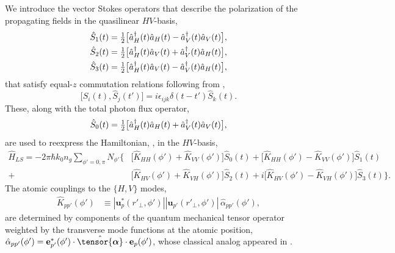 \documentclass[preprint, aps,pra,onecolumn]{revtex4-1} %
\newcommand{\poltens}{\hat{\tensor{\boldsymbol{\alpha}}}}
\newcommand{\polcomp}{\hat{K}} %
\begin{document}
We introduce the vector Stokes operators that describe the polarization of the propagating fields in the quasilinear $HV$-basis,
\begin{subequations}\label{Eq::StokesComponents}
	\begin{align} 
		\hat{S}_1(t) & = \mbox{$\frac{1}{2}$}\big[ \hat{a}^\dag_H(t) \hat{a}_H(t)-\hat{a}^\dag_V(t) \hat{a}_V(t) \big], \\
	 	\hat{S}_2(t) & = \mbox{$\frac{1}{2}$}\big[ \hat{a}^\dag_H(t) \hat{a}_V(t)+\hat{a}^\dag_V(t) \hat{a}_H(t) \big], \\ 
		\hat{S}_3(t) & = \mbox{$\frac{1}{2}$}\big[ \hat{a}^\dag_H(t) \hat{a}_V(t) -\hat{a}^\dag_V(t) \hat{a}_H(t) \big],
	\end{align}
\end{subequations}
that satisfy equal-$z$ commutation relations following from ,
	\begin{equation} \label{Eq::StokesCommutation}
		\big[\hat{S}_i(t), \hat{S}_j(t')\big] =i \epsilon_{ijk} \delta(t-t')  \hat{S}_k(t).
	\end{equation}
These, along with the total photon flux operator,
	\begin{equation}
		\hat{S}_0(t) = \mbox{$\frac{1}{2}$}\big[ \hat{a}^\dag_H(t) \hat{a}_H(t)+\hat{a}^\dag_V(t) \hat{a}_V(t) \big],
	\end{equation}
are used to reexpress the Hamiltonian, , in the $HV$-basis,
	\begin{align}  
		\hat{H}_{LS} 	= - 2 \pi \hbar k_0 n_g \sum_{\phi'=0,\pi}N_{\phi'} \Big\{ &\big[ \polcomp_{HH}(\phi')+\polcomp_{VV}(\phi') \big] \hat{S}_0(t) +  \big[\polcomp_{HH}(\phi')  - \polcomp_{VV}(\phi')  \big] \hat{S}_1(t)  \label{Eq::GenHamiltonian}  \\
+ &\big[\polcomp_{HV}(\phi') + \polcomp_{VH}(\phi')  \big] \hat{S}_2(t) + i  \big[ \polcomp_{HV}(\phi')-\polcomp_{VH}(\phi') \big]\hat{S}_3(t) \Big\}. \nonumber
	\end{align}
The atomic couplings to the $\{H,V\}$ modes,
	\begin{align} 
		\polcomp_{p p'}(\phi') & \equiv |\mathbf{u}^*_p(r'_\perp, \phi')||\mathbf{u}_{p'}(r'_\perp, \phi')| \, \hat{\alpha}_{p p'}(\phi') , 
	\end{align}
are determined by components of the quantum mechanical tensor operator weighted by the transverse mode functions at the atomic position, $\hat{\alpha}_{p p'}(\phi') = \mathbf{e}^*_{p'}(\phi') \cdot \poltens \cdot \mathbf{e}_{p}(\phi') $, whose classical analog appeared in .
\end{document}
